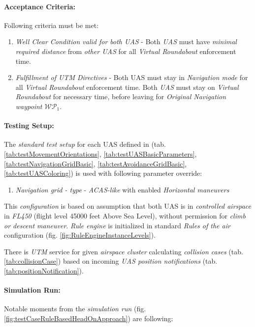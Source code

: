 \paragraph{Acceptance  Criteria:} Following criteria must be met:

\begin{enumerate}
    \item \emph{Well Clear Condition valid for both UAS} - Both \emph{UAS} must have \emph{minimal required distance} from \emph{other UAS} for all \emph{Virtual Roundabout} enforcement time.
    
    \item \emph{Fulfillment of UTM Directives} - Both UAS must stay in \emph{Navigation mode} for all \emph{Virtual Roundabout} enforcement time. Both \emph{UAS} must stay on \emph{Virtual Roundabout} for necessary time, before leaving for \emph{Original Navigation waypoint $\mathscr{WP}_1$}.
\end{enumerate}

\paragraph{Testing Setup:} The \emph{standard test setup} for each UAS defined in (tab. \ref{tab:testMovementOrientations}, \ref{tab:testUASBasicParameters}, \ref{tab:testNavigationGridBasic}, \ref{tab:testAvoidanceGridBasic}, \ref{tab:testUASColoring}) is used with following parameter override:
\begin{enumerate}
    \item \emph{Navigation grid - type} - \emph{ACAS-like} with enabled \emph{Horizontal maneuvers}
\end{enumerate}

This \emph{configuration} is based on assumption that both UAS is in \emph{controlled airspace} in \emph{FL450} (flight level 45000 feet Above Sea Level), without permission for \emph{climb or descent maneuver}. \emph{Rule engine} is initialized in standard \emph{Rules of the air} configuration (fig. \ref{fig:RuleEngineInstanceLevels}).

There is \emph{UTM} service for given \emph{airspace cluster} calculating \emph{collision cases} (tab. \ref{tab:collisionCase}) based on incoming \emph{UAS position notifications} (tab. \ref{tab:positionNotification}).

\paragraph{Simulation Run:} Notable moments from the \emph{simulation run} (fig. \ref{fig:testCaseRuleBasedHeadOnApproach}) are following:

